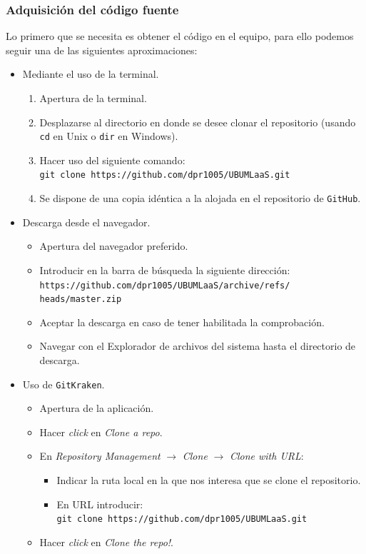 \subsubsection{Adquisición del código fuente}
Lo primero que se necesita es obtener el código en el equipo, para ello podemos seguir una de las siguientes aproximaciones:
\begin{itemize}
\item Mediante el uso de la terminal.
\begin{enumerate}
\tightlist
\item Apertura de la terminal.
\item Desplazarse al directorio en donde se desee clonar el repositorio (usando \texttt{cd} en Unix o \texttt{dir} en Windows).
\item Hacer uso del siguiente comando:\\
\texttt{git clone https://github.com/dpr1005/UBUMLaaS.git}
\item Se dispone de una copia idéntica a la alojada en el repositorio de \texttt{GitHub}.
\end{enumerate}

\item Descarga desde el navegador.
\begin{itemize}
\tightlist
\item Apertura del navegador preferido.
\item Introducir en la barra de búsqueda la siguiente dirección:\\
\texttt{https://github.com/dpr1005/UBUMLaaS/archive/refs/\\heads/master.zip}
\item Aceptar la descarga en caso de tener habilitada la comprobación.
\item Navegar con el Explorador de archivos del sistema hasta el directorio de descarga.
\end{itemize}

\item Uso de \texttt{GitKraken}.
\begin{itemize}
\tightlist
\item Apertura de la aplicación.
\item Hacer \textit{click} en \textit{Clone a repo}.
\item En \textit{Repository Management} $\rightarrow$ \textit{Clone} $\rightarrow$ \textit{Clone with URL}: 
\begin{itemize}
\item Indicar la ruta local en la que nos interesa que se clone el repositorio.
\item En URL introducir:\\
\texttt{git clone https://github.com/dpr1005/UBUMLaaS.git}
\end{itemize}
\item Hacer \textit{click} en \textit{Clone the repo!}.
\end{itemize}
\end{itemize}

